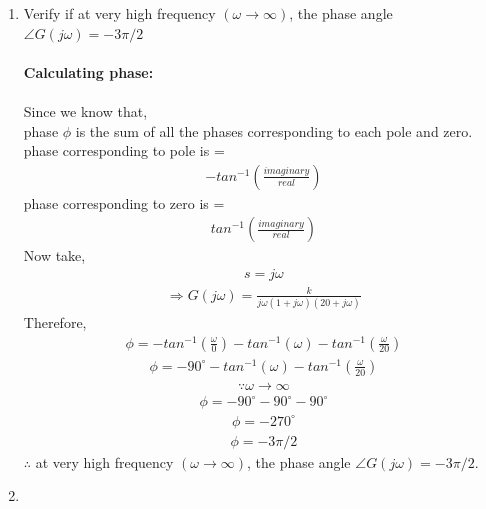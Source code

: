 \begin{enumerate}[label=\thesubsection.\arabic*.,ref=\thesubsection.\theenumi]
\item  Verify if at very high frequency $(\omega \to \infty)$, the phase angle $ \angle G(j\omega)=-3\pi/2$ \\
\solution \\
\textbf{Calculating phase:}\\ \\
Since we know that,\\
phase $ \phi $ is the sum of all the phases corresponding to each pole and zero.\\
phase corresponding to pole is =  
\begin{align}
-tan^{-1}( \frac{imaginary}{real})
\end{align} 
phase corresponding to zero is =
\begin{align}
 tan^{-1}( \frac{imaginary}{real})
 \end{align} 
Now take,
\begin{align}
 s = j\omega
  \end{align} 
  \begin{align}
 \Rightarrow  G(j\omega) =  \frac{k}{j\omega(1+j\omega)(20+j\omega)}
 \end{align} 
Therefore, 
\begin{align}
 \phi =  -tan^{-1}( {\frac{\omega}{0}}) - tan^{-1}(\omega) - tan^{-1}( \frac{\omega}{20})
 \end{align} 
 \begin{align}
  \phi =  - 90^\circ - tan^{-1}(\omega) - tan^{-1}( \frac{\omega}{20})
  \end{align} 
  \begin{align}
  \because \omega \to \infty
 \end{align} 
 \begin{align}
   \phi =   - 90^\circ - 90^\circ - 90^\circ
   \end{align} 
   \begin{align}
 \phi = -270^\circ
 \end{align} 
 \begin{align}
 \phi = -3\pi/2 
 \end{align} 
 $\therefore$ at very high frequency $(\omega \to \infty)$, the phase angle $ \angle G(j\omega)=-3\pi/2$.
 \item

\end{enumerate}
